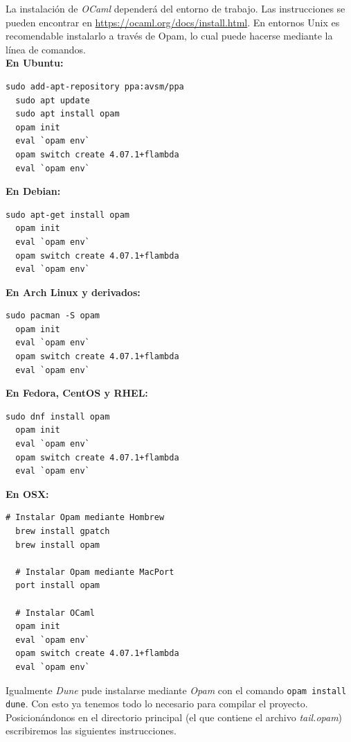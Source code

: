 La instalación de \textit{OCaml} dependerá del entorno de trabajo. Las instrucciones se pueden encontrar en \url{https://ocaml.org/docs/install.html}. En entornos Unix es recomendable instalarlo a través de Opam, lo cual puede hacerse mediante la línea de comandos.\\


\textbf{En Ubuntu:}\\

\begin{lstlisting}[style=Consola]
  sudo add-apt-repository ppa:avsm/ppa
  sudo apt update
  sudo apt install opam
  opam init
  eval `opam env`
  opam switch create 4.07.1+flambda
  eval `opam env`
\end{lstlisting}


\textbf{En Debian:}\\

\begin{lstlisting}[style=Consola]
  sudo apt-get install opam
  opam init
  eval `opam env`
  opam switch create 4.07.1+flambda
  eval `opam env`
\end{lstlisting}


\textbf{En Arch Linux y derivados:}\\

\begin{lstlisting}[style=Consola]
  sudo pacman -S opam
  opam init
  eval `opam env`
  opam switch create 4.07.1+flambda
  eval `opam env`
\end{lstlisting}


\textbf{En Fedora, CentOS y RHEL:}\\

\begin{lstlisting}[style=Consola]
  sudo dnf install opam
  opam init
  eval `opam env`
  opam switch create 4.07.1+flambda
  eval `opam env`
\end{lstlisting}


\textbf{En OSX:}\\

\begin{lstlisting}[style=Consola]
  # Instalar Opam mediante Hombrew
  brew install gpatch
  brew install opam
  
  # Instalar Opam mediante MacPort
  port install opam
  
  # Instalar OCaml
  opam init
  eval `opam env`
  opam switch create 4.07.1+flambda
  eval `opam env`
\end{lstlisting}

Igualmente \textit{Dune} pude instalarse mediante \textit{Opam} con el comando \lstinline[style=Consola]{opam install dune}. Con esto ya tenemos todo lo necesario para compilar el proyecto. Posicionándonos en el directorio principal (el que contiene el archivo \textit{tail.opam}) escribiremos las siguientes instrucciones.\\

